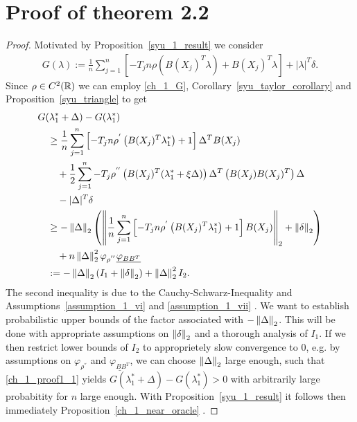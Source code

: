 \section*{Proof of theorem 2.2}


\begin{proof}
  Motivated by Proposition~\ref{syu_1_result}
  we consider
 \begin{gather}
   \label{ch_1_G}
   G(\lambda)
   :=
      \frac{1}{n}
      \sum_{j = 1}^{n} 
      \left[ 
        -T_j n 
        \rho 
        \left( 
          B(X_j)^T \lambda
        \right)
      +
      B(X_j)^T \lambda
      \right]
      +
      |\lambda|^T \delta.
 \end{gather} 
 Since 
 $\rho \in C^2(\mathbb{R})$
 we can employ 
 \eqref{ch_1_G},
 Corollary~\ref{syu_taylor_corollary}
 and
 Proposition~\ref{syu_triangle}
 to get
 \begin{align}
   \label{ch_1_proof1_1}
  \begin{split}
  & 
  G(\lambda^*_1 + \Delta) 
  -
  G(\lambda^*_1)
  \\
  &
  \quad
  \ge
      \frac{1}{n}
      \sum_{j = 1}^{n} 
      \left[ 
        -T_j n 
        \rho^{'} 
        \left( 
          B(X_j)^T \lambda^*_1
        \right)
      +
      1
      \right]
      \Delta^T B(X_j)
      \\
  & 
  \qquad
  +
      \frac{1}{2}
      \sum_{j = 1}^{n} 
        -T_j  
        \rho^{''} 
        \left( 
          B(X_j)^T (\lambda^*_1 + \xi \Delta)
        \right)
        \Delta^T
        \left( 
          B(X_j)
          B(X_j)^T
        \right)
        \Delta
        \\
  &
  \qquad
  -
      |\Delta|^T \delta
  \\
  &  
  \quad
  \ge
    - \left\lVert\Delta\right\rVert_2
    \left( 
    \left\lVert
      \frac{1}{n}
      \sum_{j = 1}^{n} 
      \left[ 
        -T_j n 
        \rho^{'} 
        \left( 
          B(X_j)^T \lambda^*_1
        \right)
      +
      1
      \right]
      B(X_j)
    \right\rVert_2
    +
    \left\lVert\delta\right\rVert_2
    \right)
    \\
  & 
  \qquad
  +
  n
  \left\lVert\Delta\right\rVert^2_2
   \varphi_{\rho^{''}}
  \underline{\varphi_{BB^T}}
  \\
  &
  \quad
  :=
  -\left\lVert\Delta\right\rVert_2
  (I_1 + \left\lVert\delta\right\rVert_2)
  +
  \left\lVert\Delta\right\rVert^2_2
  I_2
  .
  \end{split}
\end{align}
The second inequality is due to 
the Cauchy-Schwarz-Inequality 
and
Assumptions~\ref{assumption_1_vi} and \ref{assumption_1_vii}
.
We want to establish probabilistic upper bounds of the factor associated with 
$
  -\left\lVert\Delta\right\rVert_2
$. 
This will be done with appropriate assumptions on
$
  \left\lVert\delta\right\rVert_2
$
and a thorough analysis of $I_1$.
If we then restrict lower bounds of
$
  I_2
$
to approprietely slow convergence to 0,
e.g. by assumptions on
$
\varphi_{\rho^{''}}
$
and
$
\underline{
  \varphi_{BB^T}
}
$,
we can choose
$
  \left\lVert\Delta\right\rVert_2
$
large enough,
such that 
\eqref{ch_1_proof1_1}
yields
$
  G(\lambda^*_1 + \Delta) 
  -
  G(\lambda^*_1)
  >
  0
$
with arbitrarily large probabitity for $n$ large enough.
With Proposition~\ref{syu_1_result} it follows then immediately
Proposition~\ref{ch_1_near_oracle}
.

\end{proof}
